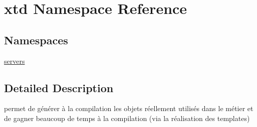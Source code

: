\hypertarget{namespacextd}{\section{xtd Namespace Reference}
\label{namespacextd}
}
\subsection*{Namespaces}
\begin{DoxyCompactItemize}
\item 
\hyperlink{namespacextd_1_1servers}{servers}
\end{DoxyCompactItemize}


\subsection{Detailed Description}
permet de générer à la compilation les objets réellement utilisés dans le métier et de gagner beaucoup de temps à la compilation (via la réalisation des templates) 